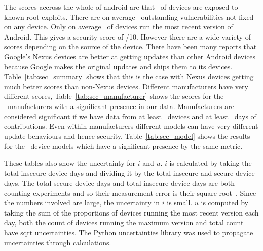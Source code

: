 The scores accross the whole of android are that \daMeanInsecurityPerc\ of devices are exposed to known root exploits.
There are on average \daMeanOutstandingVulnerabilities\ outstanding vulnerabilities not fixed on any device.
Only on average \daUpdatednessPerc\ of devices run the most recent version of Android.
This gives a security score of \daSecurityScore/10.
\daTabSecScoressummary
However there are a wide variety of scores depending on the source of the device.
There have been many reports that Google's Nexus devices are better at getting updates than other Android devices because Google makes the original updates and ships them to its devices.
Table~\ref{tab:sec_summary} shows that this is the case with Nexus devices getting much better scores than non-Nexus devices.
\daTabSecScoresmanufacturer
Different manufacturers have very different scores, Table~\ref{tab:sec_manufacturer} shows the scores for the \daNumSigManufacturers\ manufacturers with a significant presence in our data.
Manufacturers are considered significant if we have data from at least \daSigNumDevices\ devices and at least \daSigNumDeviceDays\ days of contributions.
\daTabSecScoresmodel
Even within manufacturers different models can have very different update behaviours and hence security.
Table~\ref{tab:sec_model} shows the results for the \daNumSigModels\ device models which have a significant presence by the same metric.

These tables also show the uncertainty for $i$ and $u$.
$i$ is calculated by taking the total insecure device days and dividing it by the total insecure and secure device days.
The total secure device days and total insecure device days are both counting experiments and so their measurement error is their square root~\cite{Taylor1997}.
Since the numbers involved are large, the uncertainty in $i$ is small.
$u$ is computed by taking the sum of the proportions of devices running the most recent version each day, both the count of devices running the maximum version and total count have sqrt uncertainties.
The Python uncertainties library was used to propagate uncertainties through calculations.

